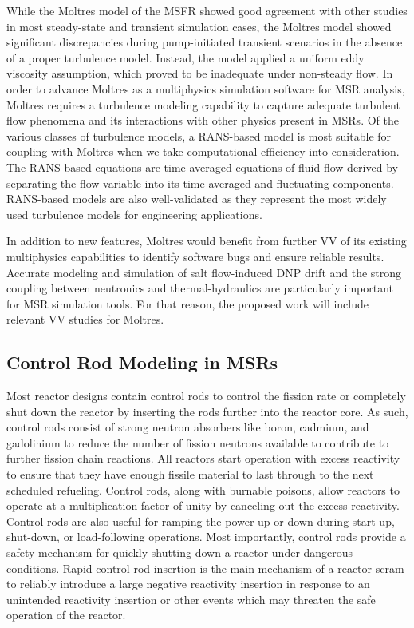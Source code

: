 While the Moltres
model of the \gls{MSFR} showed good agreement with other studies in most steady-state and transient
simulation cases, the Moltres model showed significant discrepancies during pump-initiated
transient scenarios in the absence of a proper turbulence model. Instead, the model applied a
uniform eddy viscosity assumption, which proved to be inadequate under non-steady flow. In order to
advance Moltres as a multiphysics simulation software for \gls{MSR} analysis, Moltres requires a
turbulence modeling capability to capture adequate turbulent flow phenomena and its interactions
with other physics present in \glspl{MSR}. Of the various classes of turbulence models, a
\gls{RANS}-based model is most suitable for coupling with Moltres when we take computational
efficiency into consideration. The \gls{RANS}-based equations are time-averaged equations of fluid
flow derived by separating the flow variable into its time-averaged and fluctuating components.
\gls{RANS}-based models are also well-validated as they represent the most widely used turbulence
models for engineering applications.

In addition to new features, Moltres would benefit from further \gls{VV} of its existing
multiphysics capabilities to identify software bugs and ensure reliable results. Accurate modeling
and simulation of salt flow-induced \gls{DNP} drift and the strong coupling between neutronics and
thermal-hydraulics are particularly important for \gls{MSR} simulation tools. For that reason, the
proposed work will include relevant \gls{VV} studies for Moltres.

\subsection{Control Rod Modeling in \glspl{MSR}}

Most reactor designs contain control rods to control the fission rate or completely shut down the
reactor by inserting the rods further into the reactor core. As such, control rods consist of
strong neutron absorbers like boron, cadmium, and gadolinium to reduce the number of fission
neutrons available to contribute to further fission chain reactions. All reactors start operation
with excess reactivity to ensure that they have enough fissile material to last through to the next
scheduled refueling. Control rods, along with burnable poisons, allow reactors to operate at a
multiplication factor of unity by canceling out the excess reactivity. Control rods are also useful
for ramping the power up or down during start-up, shut-down, or load-following operations. Most
importantly, control rods provide a safety mechanism for quickly shutting down a reactor under
dangerous conditions. Rapid control rod insertion is the main mechanism of a reactor scram to
reliably introduce a large negative reactivity insertion in response to an unintended reactivity
insertion or other events which may threaten the safe operation of the reactor. 

